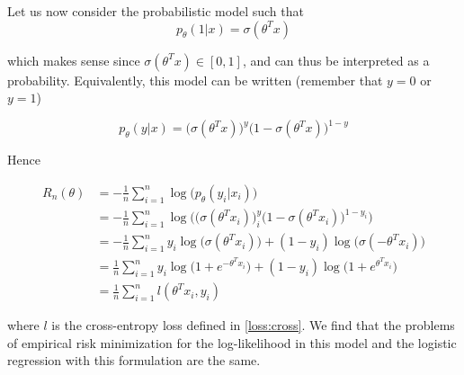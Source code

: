 \documentclass[
10pt, %
a4paper, %
oneside, %
headinclude,footinclude, %
BCOR5mm, %
]{scrartcl}
\begin{document}
Let us now consider the probabilistic model such that
\begin{equation*}
    p_{\theta}(1|x) = \sigma(\theta^Tx)
\end{equation*}

which makes sense since $\sigma(\theta^Tx)\in [0, 1]$, and can thus be interpreted as a probability. Equivalently, this model can be written (remember that $y=0$ or $y=1$)

\begin{equation*}
    p_{\theta}(y|x) = \big(\sigma(\theta^Tx)\big)^y\big(1-\sigma(\theta^Tx) \big)^{1-y}
\end{equation*}

Hence 

\begin{equation*}
    \begin{aligned}
	R_n(\theta) &= - \frac{1}{n} \sum^{n}_{i=1} \log\big(p_{\theta}(y_i|x_i)\big)\\
	&=- \frac{1}{n} \sum^{n}_{i=1} \log\Big(\big(\sigma(\theta^Tx_i)\big)^y_i\big(1-\sigma(\theta^Tx_i) \big)^{1-y_i}\Big)\\
	&=- \frac{1}{n} \sum^{n}_{i=1} y_i\log\Big(\sigma(\theta^Tx_i)\Big)+ (1-y_i)\log\Big(\sigma(-\theta^Tx_i)\Big)\\
	&=\frac{1}{n} \sum^{n}_{i=1} y_i\log\Big(1+e^{-\theta^Tx_i}\Big)+ (1-y_i)\log\Big(1+e^{\theta^Tx_i}\Big)\\
	&=\frac{1}{n} \sum^{n}_{i=1} l(\theta^Tx_i,y_i)
    \end{aligned}
\end{equation*}

where $l$ is the cross-entropy loss defined in \ref{loss:cross}. We find that the problems of empirical risk minimization for the log-likelihood in this model and the logistic regression with this formulation are the same.


 
\end{document}
